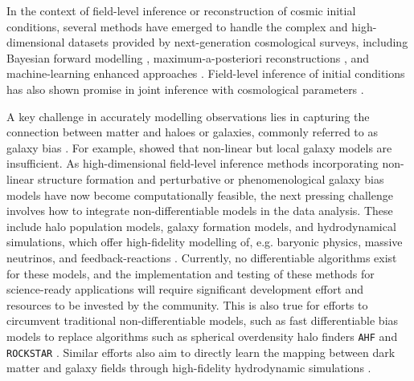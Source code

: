 In the context of field-level inference or reconstruction of cosmic initial conditions, several methods have emerged to handle the complex and high-dimensional datasets provided by next-generation cosmological surveys, including Bayesian forward modelling \citep{Jasche2012, Kitaura2013, Wang2014,  Ata2014, Jasche2015, Jasche2017, Jasche2019, Schmidt2018, Lavaux2019, Kitaura2019, Bos_2019, Ata2020, Doeser2024}, maximum-a-posteriori reconstructions \citep{Seljak2017, Modi2018,Feng2018,Horowitz2019,Modi2021a,Horowitz2023}, and machine-learning enhanced approaches \citep{Modi2018, Modi2021a, Chen2023, List2023, Legin2023, Shallue2023, Jindal2023, Bayer2023, Doeser2024, Savchenko2024, Savchenko2025}. Field-level inference of initial conditions has also shown promise in joint inference with cosmological parameters \citep{Ramanah2018,Kostic2022,Porqueres2023,Chen2024,Andrews2022,Andrews2024,Nguyen2024, Krause2024}. 

A key challenge in accurately modelling observations lies in capturing the connection between matter and haloes or galaxies, commonly referred to as galaxy bias \citep[e.g.][]{Desjacques2016}. For example, \citet{Bartlett2024a} showed that non-linear but local galaxy models are insufficient. As high-dimensional field-level inference methods incorporating non-linear structure formation and perturbative or phenomenological galaxy bias models have now become computationally feasible, the next pressing challenge involves how to integrate non-differentiable models in the data analysis. These include halo population models, galaxy formation models, and hydrodynamical simulations, which offer high-fidelity modelling of, e.g. baryonic physics, massive neutrinos, and feedback-reactions \citep[see, e.g.][]{Villaescusa-Navarro2020a,Schaye2023,Pakmor2023}. Currently, no differentiable algorithms exist for these models, and the implementation and testing of these methods for science-ready applications will require significant development effort and resources to be invested by the community. This is also true for efforts to circumvent traditional non-differentiable models, such as fast differentiable bias models \citep{Modi2018, Charnock2020, Ding2024, Pandey2024a, Pandey2024} to replace algorithms such as spherical overdensity halo finders \texttt{AHF} \citep{Knollmann2009} and \texttt{ROCKSTAR} \citep{Behroozi2013}. Similar efforts also aim to directly learn the mapping between dark matter and galaxy fields through high-fidelity hydrodynamic simulations \citep{Villaescusa-Navarro2020a,Sether2024,Bourdin2024,Horowitz2025}. 

